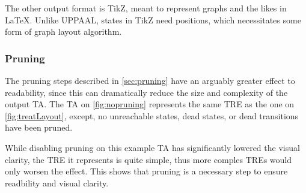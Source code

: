 \begin{center}
    
    
\end{center}
\vspace{1em}

The other output format is TikZ, meant to represent graphs and the likes in LaTeX. Unlike UPPAAL, states in TikZ need positions, which necessitates some form of graph layout algorithm.

\subsubsection{Pruning}

The pruning steps described in \cref{sec:pruning} have an arguably greater effect to readability, since this can dramatically reduce the size and complexity of the output TA.
The TA on \cref{fig:nopruning} represents the same TRE as the one on \cref{fig:treatLayout}, except, no unreachable states, dead states, or dead transitions have been pruned.

\begin{center}
    
\end{center}

While disabling pruning on this example TA has significantly lowered the visual clarity, the TRE it represents is quite simple, thus more comples TREs would only worsen the effect. This shows that pruning is a necessary step to ensure readbility and visual clarity.